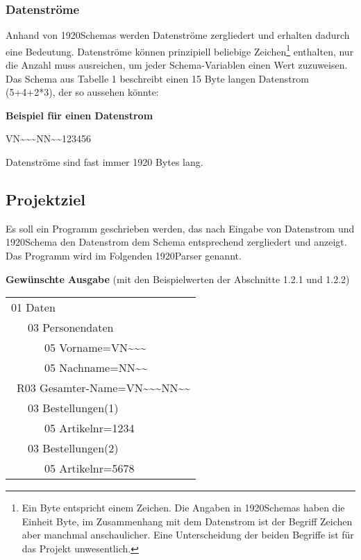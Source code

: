 \subsubsection{Datenströme}
Anhand von 1920Schemas werden Datenströme zergliedert und erhalten dadurch eine Bedeutung. Datenströme können prinzipiell beliebige Zeichen\footnote{Ein Byte entspricht einem Zeichen. Die Angaben in 1920Schemas haben die Einheit Byte, im Zusammenhang mit dem Datenstrom ist der Begriff Zeichen aber manchmal anschaulicher. Eine Unterscheidung der beiden Begriffe ist für das Projekt unwesentlich.} enthalten, nur die Anzahl muss ausreichen, um jeder Schema-Variablen einen Wert zuzuweisen. Das Schema aus Tabelle 1 beschreibt einen 15 Byte langen Datenstrom (5+4+2*3), der so aussehen könnte:

\textbf{Beispiel für einen Datenstrom}

VN\textasciitilde \textasciitilde \textasciitilde NN\textasciitilde\textasciitilde123456

Datenströme sind fast immer 1920 Bytes lang.


\subsection{Projektziel}
\label{sec:Projektziel}
Es soll ein Programm geschrieben werden, das nach Eingabe von Datenstrom und 1920Schema den Datenstrom dem Schema entsprechend zergliedert und anzeigt. Das Programm wird im Folgenden 1920Parser genannt.

\textbf{Gewünschte Ausgabe} (mit den Beispielwerten der Abschnitte 1.2.1 und 1.2.2)

\begin{tabularx}{0px}{l}
01 Daten\\
\ \ \ 03 Personendaten\\
\ \ \ \ \ \ 05 Vorname=VN\textasciitilde \textasciitilde \textasciitilde\\
\ \ \ \ \ \ 05 Nachname=NN\textasciitilde \textasciitilde\\
\ R03 Gesamter-Name=VN\textasciitilde \textasciitilde \textasciitilde NN\textasciitilde \textasciitilde\\
\ \ \ 03 Bestellungen(1)\\
\ \ \ \ \ \ 05 Artikelnr=1234\\
\ \ \ 03 Bestellungen(2)\\
\ \ \ \ \ \ 05 Artikelnr=5678\\
\end{tabularx}


